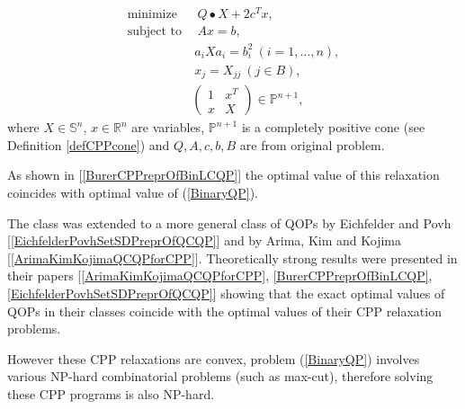 \documentclass[12pt]{book}
\theoremstyle{definition}
\begin{document}
\begin{equation}
\label{BinaryQP CCP Relaxation}
\begin{array}{ll}
\mbox{minimize}&\ \ Q\bullet X + 2c^Tx ,\\
\mbox{subject to}&\ \ Ax = b,\\
				 & \ a_iXa_i = b_i^2 \ (i=1,\dots ,n), \\
				 & \ x_j = X_{jj} \ (j \in B), \\
				 &\left(\begin{array}{rr} 1 & x^T \\ x & X\end{array}\right) \in \mathbb{P}^{n+1}, 
\end{array}
\end{equation}
where $X\in \mathbb{S}^n$, $x\in\mathbb{R}^n$ are variables, $\mathbb{P}^{n+1}$ is a completely positive cone (see Definition \ref{defCPPcone}) and $Q,A,c,b,B$ are from original problem. 

As shown in [\ref{BurerCPPreprOfBinLCQP}] the optimal value of this relaxation coincides with optimal value of (\ref{BinaryQP}).

The class was extended to a more general class of QOPs by Eichfelder and
Povh [\ref{EichfelderPovhSetSDPreprOfQCQP}] and by Arima, Kim and Kojima [\ref{ArimaKimKojimaQCQPforCPP}]. Theoretically strong results were presented in
their papers [\ref{ArimaKimKojimaQCQPforCPP}, \ref{BurerCPPreprOfBinLCQP}, \ref{EichfelderPovhSetSDPreprOfQCQP}] showing that the exact optimal values of QOPs in their classes coincide
with the optimal values of their CPP relaxation problems.

However these CPP relaxations are convex, problem (\ref{BinaryQP}) involves various NP-hard combinatorial problems (such as max-cut), therefore solving these CPP programs is also NP-hard. 
\end{document}
